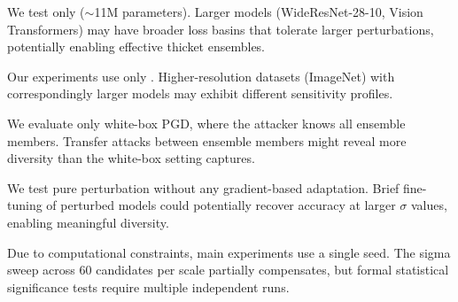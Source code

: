  We test only \resnet ($\sim$11M parameters). Larger models (\eg WideResNet-28-10, Vision Transformers) may have broader loss basins that tolerate larger perturbations, potentially enabling effective thicket ensembles.

 Our experiments use only \cifarten. Higher-resolution datasets (\eg ImageNet) with correspondingly larger models may exhibit different sensitivity profiles.

 We evaluate only white-box PGD, where the attacker knows all ensemble members. Transfer attacks between ensemble members might reveal more diversity than the white-box setting captures.

 We test pure perturbation without any gradient-based adaptation. Brief fine-tuning of perturbed models could potentially recover accuracy at larger $\sigma$ values, enabling meaningful diversity.

 Due to computational constraints, main experiments use a single seed. The sigma sweep across 60 candidates per scale partially compensates, but formal statistical significance tests require multiple independent runs.

